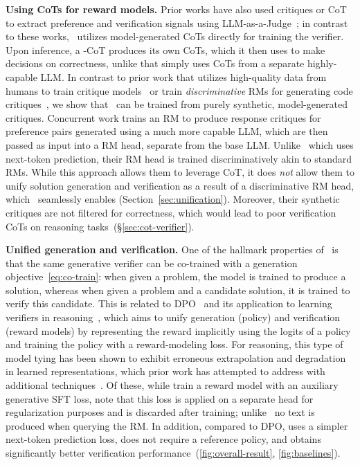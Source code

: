 \textbf{Using CoTs for reward models.} Prior works have also used critiques or CoT to extract preference and verification signals using LLM-as-a-Judge~\citep{self-reward-lm, meta-rewarding-lm, self-taught-evaluator}; in contrast to these works, \genV\ utilizes model-generated CoTs directly for training the verifier. Upon inference, a \genV-CoT produces its own CoTs, which it then uses to make decisions on correctness, unlike \citet{improve-rm-synthetic-critique} that simply uses CoTs from a separate highly-capable LLM. In contrast to prior work that utilizes high-quality data from humans to train critique models~\citep{self-critique-models} or train \emph{discriminative} RMs for generating code critiques~\citep{critic-gpt}, we show that \genV\ can be trained from purely synthetic, model-generated critiques. 
Concurrent work \citep{ankner2024critique} trains an RM to produce response critiques for preference pairs generated using a much more capable LLM, which are then passed as input into a RM head, separate from the base LLM. Unlike \genV\ which uses next-token prediction, their RM head is trained discriminatively akin to standard RMs. While this approach allows them to leverage CoT, it does \emph{not} allow them to unify solution generation and verification as a result of a discriminative RM head, which \genV\ seamlessly enables (Section~\ref{sec:unification}). Moreover, their synthetic critiques are not filtered for correctness, which would lead to poor verification CoTs on reasoning tasks~(\S\ref{sec:cot-verifier}). 


\textbf{Unified generation and verification.} One of the hallmark properties of \genV\ is that the same generative verifier can be co-trained with a generation objective~\eqref{eq:co-train}: when given a problem, the model is trained to produce a solution, whereas when given a problem and a candidate solution, it is trained to verify this candidate. This is related to DPO~\citep{rafailov2024direct} and its application to learning verifiers in reasoning~\citep{hosseini2024v}, which aims to unify generation (policy) and verification (reward models) by representing the reward implicitly using the logits of a policy and training the policy with a reward-modeling loss. 
For reasoning, this type of model tying has been shown to exhibit erroneous extrapolation and degradation in learned representations, which prior work has attempted to address with additional techniques~\citep{iterative-reasoning-preference-op, rl-on-incorrect,pal2024smaug,yang2024regularizing}. Of these, while \citet{yang2024regularizing} train a reward model with an auxiliary generative SFT loss, note that this loss is applied on a separate head for regularization purposes and is discarded after training; unlike \genV\ no text is produced when querying the RM. In addition, compared to DPO, {\genV} uses a simpler next-token prediction loss, does not require a reference policy, and obtains significantly better verification performance~(\autoref{fig:overall-result}, \ref{fig:baselines}).

